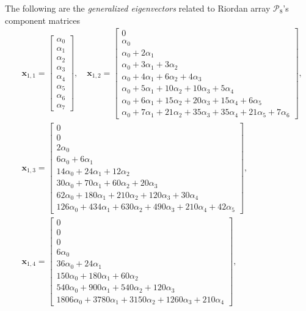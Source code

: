 The following are the \textit{generalized eigenvectors} related to Riordan array $\mathcal{P}_{8}$'s component matrices
\begin{displaymath}
\begin{split}
&\boldsymbol{x}_{1,1} = \left[\begin{matrix}\alpha_{0}\\\alpha_{1}\\\alpha_{2}\\\alpha_{3}\\\alpha_{4}\\\alpha_{5}\\\alpha_{6}\\\alpha_{7}\end{matrix}\right], \quad \boldsymbol{x}_{1,2} = \left[\begin{matrix}0\\\alpha_{0}\\\alpha_{0} + 2 \alpha_{1}\\\alpha_{0} + 3 \alpha_{1} + 3 \alpha_{2}\\\alpha_{0} + 4 \alpha_{1} + 6 \alpha_{2} + 4 \alpha_{3}\\\alpha_{0} + 5 \alpha_{1} + 10 \alpha_{2} + 10 \alpha_{3} + 5 \alpha_{4}\\\alpha_{0} + 6 \alpha_{1} + 15 \alpha_{2} + 20 \alpha_{3} + 15 \alpha_{4} + 6 \alpha_{5}\\\alpha_{0} + 7 \alpha_{1} + 21 \alpha_{2} + 35 \alpha_{3} + 35 \alpha_{4} + 21 \alpha_{5} + 7 \alpha_{6}\end{matrix}\right], \\ 
&\boldsymbol{x}_{1,3} = \left[\begin{matrix}0\\0\\2 \alpha_{0}\\6 \alpha_{0} + 6 \alpha_{1}\\14 \alpha_{0} + 24 \alpha_{1} + 12 \alpha_{2}\\30 \alpha_{0} + 70 \alpha_{1} + 60 \alpha_{2} + 20 \alpha_{3}\\62 \alpha_{0} + 180 \alpha_{1} + 210 \alpha_{2} + 120 \alpha_{3} + 30 \alpha_{4}\\126 \alpha_{0} + 434 \alpha_{1} + 630 \alpha_{2} + 490 \alpha_{3} + 210 \alpha_{4} + 42 \alpha_{5}\end{matrix}\right], \\
&\boldsymbol{x}_{1,4} = \left[\begin{matrix}0\\0\\0\\6 \alpha_{0}\\36 \alpha_{0} + 24 \alpha_{1}\\150 \alpha_{0} + 180 \alpha_{1} + 60 \alpha_{2}\\540 \alpha_{0} + 900 \alpha_{1} + 540 \alpha_{2} + 120 \alpha_{3}\\1806 \alpha_{0} + 3780 \alpha_{1} + 3150 \alpha_{2} + 1260 \alpha_{3} + 210 \alpha_{4}\end{matrix}\right], \\ 

\end{split}
\end{displaymath}
